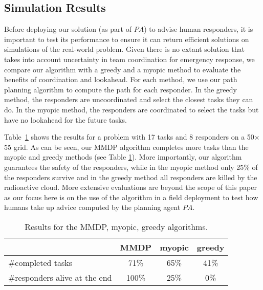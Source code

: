\subsection{Simulation Results}

Before deploying our solution (as part of $PA$) to advise human
responders, it is important  to test its performance to ensure it
can return efficient solutions on simulations of the real-world
problem. Given there is no extant solution that takes into account
uncertainty in team coordination for emergency response, we compare
our algorithm with a greedy and a myopic method to evaluate the
benefits of coordination and lookahead. For each method, we use our
path planning algorithm to compute the path for each responder. In
the greedy method, the responders are uncoordinated and select the
closest tasks they can do. In the myopic method, the responders are
coordinated to select the tasks but have no lookahead for the
future tasks.

Table~\ref{tab:simulation} shows the results for a problem with 17
tasks and 8 responders on a 50$\times$55 grid. As can be seen, our
MMDP algorithm completes more tasks than the myopic and greedy
methods (see Table \ref{tab:simulation}). More importantly, our
algorithm guarantees the safety of the responders, while in the
myopic method  only 25\% of the responders survive and in the
greedy method all responders are killed by the radioactive cloud.
More extensive evaluations are beyond the scope of this paper as
our focus here is on the use of the algorithm in a field deployment
to test how humans take up advice computed by the planning agent
$PA$.
\begin{table}[htbp]
  \centering\small
  
  \begin{tabular}{l|c|c|c}
   & MMDP & myopic & greedy \\
  \hline
  \#completed tasks & 71\% & 65\% & 41\% \\
  \hline
  \#responders alive at the end & 100\% & 25\% & 0\% \\
  \end{tabular}\caption{Results for the MMDP, myopic, greedy
  algorithms.}
  \label{tab:simulation}\vspace{-3mm}
\end{table}
